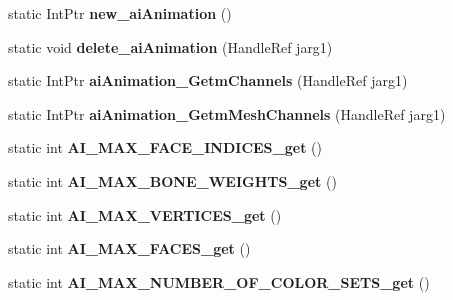 \begin{DoxyCompactItemize}
\item 
\hypertarget{class_assimp_p_i_n_v_o_k_e_a55240ee0d3a3afc7d864e642f1f18ab7}{static Int\+Ptr {\bfseries new\+\_\+ai\+Animation} ()}\label{class_assimp_p_i_n_v_o_k_e_a55240ee0d3a3afc7d864e642f1f18ab7}

\item 
\hypertarget{class_assimp_p_i_n_v_o_k_e_a7ec27db3a3298b51b788d83794f27544}{static void {\bfseries delete\+\_\+ai\+Animation} (Handle\+Ref jarg1)}\label{class_assimp_p_i_n_v_o_k_e_a7ec27db3a3298b51b788d83794f27544}

\item 
\hypertarget{class_assimp_p_i_n_v_o_k_e_a3ef4569926f58bae7ba00e116781d3e3}{static Int\+Ptr {\bfseries ai\+Animation\+\_\+\+Getm\+Channels} (Handle\+Ref jarg1)}\label{class_assimp_p_i_n_v_o_k_e_a3ef4569926f58bae7ba00e116781d3e3}

\item 
\hypertarget{class_assimp_p_i_n_v_o_k_e_a25a3433b79526ab585648fa4c1c9ed78}{static Int\+Ptr {\bfseries ai\+Animation\+\_\+\+Getm\+Mesh\+Channels} (Handle\+Ref jarg1)}\label{class_assimp_p_i_n_v_o_k_e_a25a3433b79526ab585648fa4c1c9ed78}

\item 
\hypertarget{class_assimp_p_i_n_v_o_k_e_afd7a2064c4f975557f086546b2e8c3f0}{static int {\bfseries A\+I\+\_\+\+M\+A\+X\+\_\+\+F\+A\+C\+E\+\_\+\+I\+N\+D\+I\+C\+E\+S\+\_\+get} ()}\label{class_assimp_p_i_n_v_o_k_e_afd7a2064c4f975557f086546b2e8c3f0}

\item 
\hypertarget{class_assimp_p_i_n_v_o_k_e_aa87837800b5f209996d33fea1ed06b01}{static int {\bfseries A\+I\+\_\+\+M\+A\+X\+\_\+\+B\+O\+N\+E\+\_\+\+W\+E\+I\+G\+H\+T\+S\+\_\+get} ()}\label{class_assimp_p_i_n_v_o_k_e_aa87837800b5f209996d33fea1ed06b01}

\item 
\hypertarget{class_assimp_p_i_n_v_o_k_e_ac3591cf625f2322d367ff43e22e3c40c}{static int {\bfseries A\+I\+\_\+\+M\+A\+X\+\_\+\+V\+E\+R\+T\+I\+C\+E\+S\+\_\+get} ()}\label{class_assimp_p_i_n_v_o_k_e_ac3591cf625f2322d367ff43e22e3c40c}

\item 
\hypertarget{class_assimp_p_i_n_v_o_k_e_a5af43ac5ddfa6a58c48440dab39d71ff}{static int {\bfseries A\+I\+\_\+\+M\+A\+X\+\_\+\+F\+A\+C\+E\+S\+\_\+get} ()}\label{class_assimp_p_i_n_v_o_k_e_a5af43ac5ddfa6a58c48440dab39d71ff}

\item 
\hypertarget{class_assimp_p_i_n_v_o_k_e_a9f866ec6297a126b2cdbb30878d76ffc}{static int {\bfseries A\+I\+\_\+\+M\+A\+X\+\_\+\+N\+U\+M\+B\+E\+R\+\_\+\+O\+F\+\_\+\+C\+O\+L\+O\+R\+\_\+\+S\+E\+T\+S\+\_\+get} ()}\label{class_assimp_p_i_n_v_o_k_e_a9f866ec6297a126b2cdbb30878d76ffc}


\end{DoxyCompactItemize}
